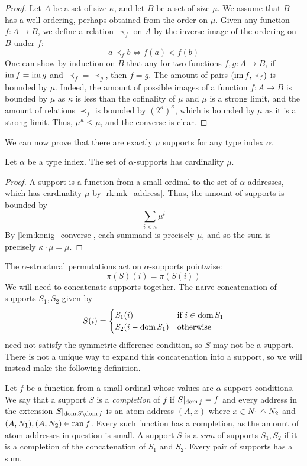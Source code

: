 \begin{proof}
    Let \( A \) be a set of size \( \kappa \), and let \( B \) be a set of size \( \mu \).
    We assume that \( B \) has a well-ordering, perhaps obtained from the order on \( \mu \).
    Given any function \( f : A \to B \), we define a relation \( \prec_f \) on \( A \) by the inverse image of the ordering on \( B \) under \( f \):
    \[ a \prec_f b \iff f(a) < f(b) \]
    One can show by induction on \( B \) that any for two functions \( f, g : A \to B \), if \( \operatorname{im} f = \operatorname{im} g \) and \( \prec_f = \prec_g \), then \( f = g \).
    The amount of pairs \( (\operatorname{im} f, \prec_f) \) is bounded by \( \mu \).
    Indeed, the amount of possible images of a function \( f : A \to B \) is bounded by \( \mu \) as \( \kappa \) is less than the cofinality of \( \mu \) and \( \mu \) is a strong limit, and the amount of relations \( \prec_f \) is bounded by \( (2^\kappa)^\kappa \), which is bounded by \( \mu \) as it is a strong limit.
    Thus, \( \mu^\kappa \leq \mu \), and the converse is clear.
\end{proof}
We can now prove that there are exactly \( \mu \) supports for any type index \( \alpha \).
\begin{proposition}
    \label{prop:mk_support}
    Let \( \alpha \) be a type index.
    The set of \( \alpha \)-supports has cardinality \( \mu \).
\end{proposition}
\begin{proof}
    A support is a function from a small ordinal to the set of \( \alpha \)-addresses, which has cardinality \( \mu \) by \cref{rk:mk_address}.
    Thus, the amount of supports is bounded by
    \[ \sum_{i < \kappa} \mu^i \]
    By \cref{lem:konig_converse}, each summand is precisely \( \mu \), and so the sum is precisely \( \kappa \cdot \mu = \mu \).
\end{proof}
The \( \alpha \)-structural permutations act on \( \alpha \)-supports pointwise:
\[ \pi(S)(i) = \pi(S(i)) \]
We will need to concatenate supports together.
The naïve concatenation of supports \( S_1, S_2 \) given by
\[ S(i) = \begin{cases}
    S_1(i) & \text{if } i \in \operatorname{dom} S_1 \\
    S_2(i - \operatorname{dom} S_1) & \text{otherwise}
\end{cases} \]
need not satisfy the symmetric difference condition, so \( S \) may not be a support.
There is not a unique way to expand this concatenation into a support, so we will instead make the following definition.
\begin{definition}
    Let \( f \) be a function from a small ordinal whose values are \( \alpha \)-support conditions.
    We say that a support \( S \) is a \emph{completion} of \( f \) if \( S|_{\operatorname{dom} f} = f \) and every address in the extension \( S|_{\operatorname{dom} S \setminus \operatorname{dom} f} \) is an atom address \( (A, x) \) where \( x \in N_1 \symmdiff N_2 \) and \( (A, N_1), (A, N_2) \in \operatorname{ran} f \).
    Every such function has a completion, as the amount of atom addresses in question is small.
    A support \( S \) is a \emph{sum} of supports \( S_1, S_2 \) if it is a completion of the concatenation of \( S_1 \) and \( S_2 \).
    Every pair of supports has a sum.
\end{definition}

